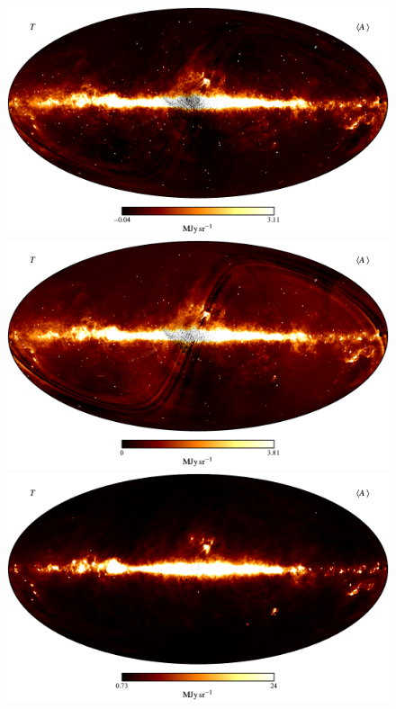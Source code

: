 \documentclass{aa}
\begin{document}
\begin{figure}
	\centering
	\includegraphics[width=0.73\linewidth]{figs/CG_DIRBE_05_n0512_DR2_I_MEAN_w18_n512_cb_c-afmhot.pdf}\\
        \includegraphics[width=0.73\linewidth]{figs/CG_DIRBE_06_n0512_DR2_I_MEAN_w18_n512_cb_c-afmhot.pdf}\\
        \includegraphics[width=0.73\linewidth]{figs/CG_DIRBE_07_n0512_DR2_I_MEAN_w18_n512_cb_c-afmhot.pdf}
	\caption{}
	\label{fig:freqmaps5_7}
\end{figure}
\end{document}
